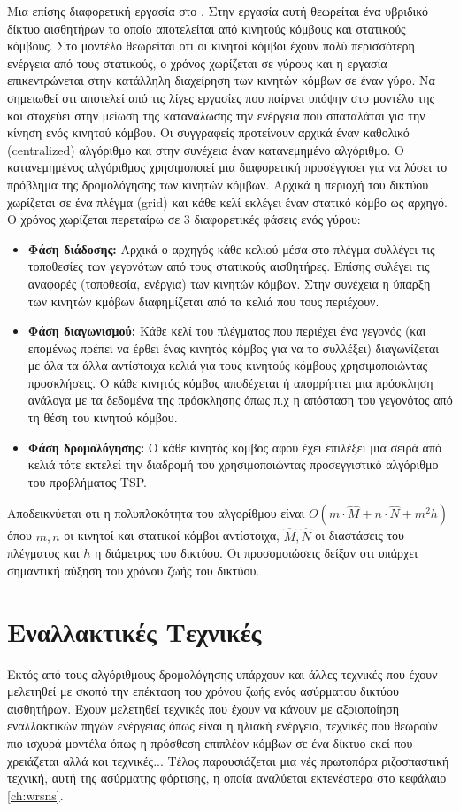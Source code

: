 Μια επίσης διαφορετική εργασία στο \cite{auction_energy_balance}. Στην εργασία αυτή θεωρείται ένα υβριδικό δίκτυο αισθητήρων το οποίο αποτελείται από κινητούς
κόμβους και στατικούς κόμβους. Στο μοντέλο θεωρείται οτι οι κινητοί κόμβοι έχουν πολύ περισσότερη ενέργεια από τους στατικούς, ο χρόνος χωρίζεται σε γύρους και η
εργασία επικεντρώνεται στην κατάλληλη διαχείρηση των κινητών κόμβων σε έναν γύρο. Να σημειωθεί οτι αποτελεί από τις λίγες εργασίες που παίρνει υπόψην στο μοντέλο της
και στοχεύει στην μείωση της κατανάλωσης την ενέργεια που σπαταλάται για την κίνηση ενός κινητού κόμβου. Οι συγγραφείς προτείνουν αρχικά έναν καθολικό (centralized)
αλγόριθμο και στην συνέχεια έναν κατανεμημένο αλγόριθμο. O κατανεμημένος αλγόριθμος χρησιμοποιεί μια διαφορετική προσέγγισει για να λύσει το πρόβλημα της
δρομολόγησης των κινητών κόμβων. Αρχικά η περιοχή του δικτύου χωρίζεται σε ένα πλέγμα (grid) και κάθε κελί εκλέγει έναν στατικό κόμβο ως αρχηγό. Ο χρόνος χωρίζεται
περεταίρω σε 3 διαφορετικές φάσεις ενός γύρου:
\begin{itemize}
\item \textbf{Φάση διάδοσης:} Αρχικά ο αρχηγός κάθε κελιού μέσα στο πλέγμα συλλέγει τις τοποθεσίες των γεγονότων από τους στατικούς αισθητήρες. Επίσης συλέγει τις
αναφορές (τοποθεσία, ενέργια) των κινητών κόμβων. Στην συνέχεια η ύπαρξη των κινητών κμόβων διαφημίζεται από τα κελιά που τους περιέχουν.
\item \textbf{Φάση διαγωνισμού:} Κάθε κελί του πλέγματος που περιέχει ένα γεγονός (και επομένως πρέπει να έρθει ένας κινητός κόμβος για να το συλλέξει) διαγωνίζεται
με όλα τα άλλα αντίστοιχα κελιά για τους κινητούς κόμβους χρησιμοποιώντας προσκλήσεις. Ο κάθε κινητός κόμβος αποδέχεται ή απορρήπτει μια πρόσκληση ανάλογα με τα
δεδομένα της πρόσκλησης όπως π.χ η απόσταση του γεγονότος από τη θέση του κινητού κόμβου.
\item \textbf{Φάση δρομολόγησης:} Ο κάθε κινητός κόμβος αφού έχει επιλέξει μια σειρά από κελιά τότε εκτελεί την διαδρομή του χρησιμοποιώντας προσεγγιστικό αλγόριθμο
του προβλήματος TSP.
\end{itemize}
Αποδεικνύεται οτι η πολυπλοκότητα του αλγορίθμου είναι $O(m\cdot\hat{M} + n\cdot\hat{N} + m^{2}h)$ όπου $m,n$ οι κινητοί και στατικοί κόμβοι αντίστοιχα, $\hat{M},
\hat{N}$ οι διαστάσεις του πλέγματος και $h$ η διάμετρος του δικτύου. Οι προσομοιώσεις δείξαν οτι υπάρχει σημαντική αύξηση του χρόνου ζωής του δικτύου.



\section{Εναλλακτικές Τεχνικές} %
Εκτός από τους αλγόριθμους δρομολόγησης υπάρχουν και άλλες τεχνικές που έχουν μελετηθεί με σκοπό την επέκταση του χρόνου ζωής ενός ασύρματου δικτύου αισθητήρων.
Έχουν μελετηθεί τεχνικές που έχουν να κάνουν με αξοιοποίηση εναλλακτικών πηγών ενέργειας όπως είναι η ηλιακή ενέργεια, τεχνικές που θεωρούν πιο ισχυρά μοντέλα όπως
η πρόσθεση επιπλέον κόμβων σε ένα δίκτυο εκεί που χρειάζεται αλλά και τεχνικές... Τέλος παρουσιάζεται μια νές πρωτοπόρα ριζοσπαστική τεχνική, αυτή της ασύρματης
φόρτισης, η οποία αναλύεται εκτενέστερα στο κεφάλαιο \ref{ch:wrsns}.

